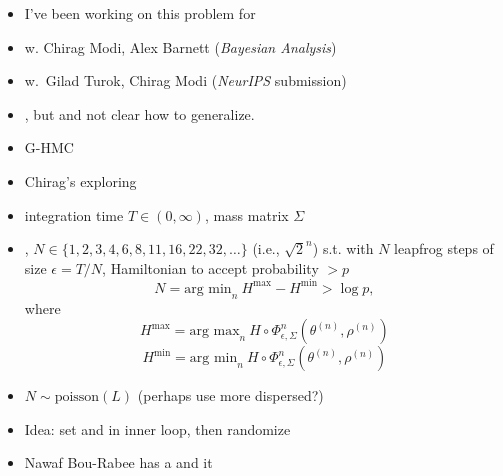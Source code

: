 \documentclass[10pt]{report}
\newcommand{\pos}[2]{#1^{(#2)}}
\begin{document}
\begin{itemize}
\item I've been working on this problem for 
\item {} w. Chirag
  Modi, Alex Barnett ({\slshape Bayesian Analysis})
\item {} w.\ Gilad
      Turok, Chirag Modi ({\slshape NeurIPS} submission)
    \item {}, but  and not clear how
      to generalize.
    \item G-HMC 
      \item Chirag's exploring 
\end{itemize}

\begin{itemize}
\item {} integration time $T \in (0, \infty)$, mass matrix $\Sigma$
\item {},  $N \in \{ 1, 2, 3, 4, 6, 
  8, 11, 16, 22, 32, \ldots \}$ (i.e., $\sqrt{2}^n$) s.t. with $N$ leapfrog 
  steps of size $\epsilon = T / N$, Hamiltonian 
  to accept probability $ > p$
  $$
  N = \textrm{arg min}_n \ H^{\textrm{max}} - H^{\textrm{min}} > \log p, 
  $$
  where 
  $$
  H^{\textrm{max}} = \textrm{arg max}_n \ H \circ \Phi^{n}_{\epsilon,\Sigma}(\pos{\theta}{n}, \pos{\rho}{n}) 
  $$
  $$
  H^{\textrm{min}} = \textrm{arg min}_n \ H \circ \Phi^{n}_{\epsilon,\Sigma}(\pos{\theta}{n}, \pos{\rho}{n}) 
  $$
\item {} $N \sim \textrm{poisson}(L)$ \hfill (perhaps use
  more dispersed?)
\end{itemize}

\begin{itemize}
\item Idea: set  and  in
  inner loop, then randomize
\item Nawaf Bou-Rabee has a  and it 
\end{itemize}
\end{document}
